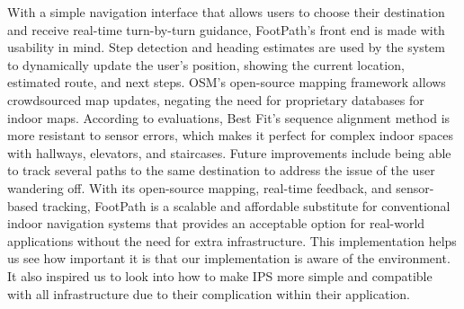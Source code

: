 \documentclass[conference]{IEEEtran}
\begin{document}
	With a simple navigation interface that allows users to choose their destination and receive real-time turn-by-turn guidance, FootPath's front end is made with usability in mind. Step detection and heading estimates are used by the system to dynamically update the user's position, showing the current location, estimated route, and next steps. OSM's open-source mapping framework allows crowdsourced map updates, negating the need for proprietary databases for indoor maps. According to evaluations, Best Fit's sequence alignment method is more resistant to sensor errors, which makes it perfect for complex indoor spaces with hallways, elevators, and staircases. Future improvements include being able to track several paths to the same destination to address the issue of the user wandering off. With its open-source mapping, real-time feedback, and sensor-based tracking, FootPath is a scalable and affordable substitute for conventional indoor navigation systems that provides an acceptable option for real-world applications without the need for extra infrastructure. This implementation helps us see how important it is that our implementation is aware of the environment. It also inspired us to look into how to make IPS more simple and compatible with all infrastructure due to their complication within their application. 
	
\end{document}
